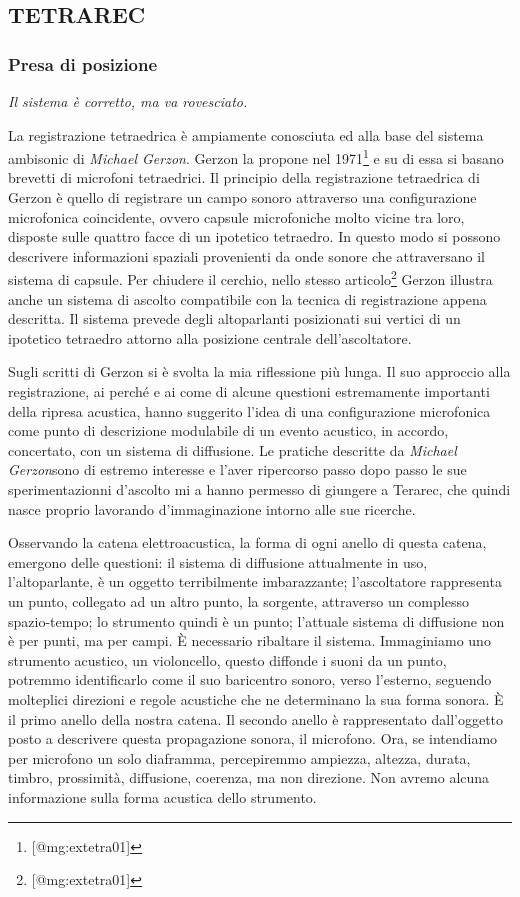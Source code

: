 \documentclass[a4paper,11pt]{article}
\begin{document}
\subsection{TETRAREC}\hypertarget{tetrarec}{}\label{tetrarec}

\subsubsection{Presa di posizione}\hypertarget{presa-di-posizione}{}\label{presa-di-posizione}

\emph{Il sistema è corretto, ma va rovesciato.}

La registrazione tetraedrica è ampiamente conosciuta ed alla base del
sistema ambisonic di \emph{Michael Gerzon}. Gerzon la propone nel 1971\footnote{{[}@mg:extetra01{]}} e
su di essa si basano brevetti di microfoni tetraedrici. Il principio
della registrazione tetraedrica di Gerzon è quello di registrare un
campo sonoro attraverso una configurazione microfonica coincidente,
ovvero capsule microfoniche molto vicine tra loro, disposte sulle
quattro facce di un ipotetico tetraedro. In questo modo si possono
descrivere informazioni spaziali provenienti da onde sonore che
attraversano il sistema di capsule. Per chiudere il cerchio, nello
stesso articolo\footnote{{[}@mg:extetra01{]}} Gerzon illustra anche un sistema di ascolto
compatibile con la tecnica di registrazione appena descritta. Il sistema
prevede degli altoparlanti posizionati sui vertici di un ipotetico
tetraedro attorno alla posizione centrale dell'ascoltatore.

Sugli scritti di Gerzon si è svolta la mia riflessione più lunga. Il suo
approccio alla registrazione, ai perché e ai come di alcune questioni
estremamente importanti della ripresa acustica, hanno suggerito l'idea
di una configurazione microfonica come punto di descrizione modulabile
di un evento acustico, in accordo, concertato, con un sistema di
diffusione. Le pratiche descritte da \emph{Michael Gerzon}sono di estremo
interesse e l'aver ripercorso passo dopo passo le sue sperimentazionni
d'ascolto mi a hanno permesso di giungere a Terarec, che quindi nasce
proprio lavorando d'immaginazione intorno alle sue ricerche.

Osservando la catena elettroacustica, la forma di ogni anello di questa
catena, emergono delle questioni: il sistema di diffusione attualmente
in uso, l'altoparlante, è un oggetto terribilmente imbarazzante;
l'ascoltatore rappresenta un punto, collegato ad un altro punto, la
sorgente, attraverso un complesso spazio-tempo; lo strumento quindi è un
punto; l'attuale sistema di diffusione non è per punti, ma per campi. È
necessario ribaltare il sistema. Immaginiamo uno strumento acustico, un
violoncello, questo diffonde i suoni da un punto, potremmo identificarlo
come il suo baricentro sonoro, verso l'esterno, seguendo molteplici
direzioni e regole acustiche che ne determinano la sua forma sonora. È
il primo anello della nostra catena. Il secondo anello è rappresentato
dall'oggetto posto a descrivere questa propagazione sonora, il
microfono. Ora, se intendiamo per microfono un solo diaframma,
percepiremmo ampiezza, altezza, durata, timbro, prossimità, diffusione,
coerenza, ma non direzione. Non avremo alcuna informazione sulla forma
acustica dello strumento.
\end{document}

